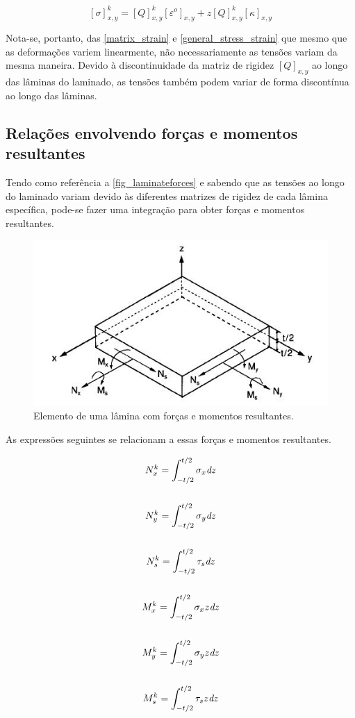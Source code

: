 \begin{equation} \label{general_stress_strain}
		[\sigma]^k_{x,y}=[Q]^k_{x,y}[\varepsilon^o]_{x,y}+z[Q]^k_{x,y}[\kappa]_{x,y}
\end{equation}

Nota-se, portanto, das \autoref{matrix_strain} e \autoref{general_stress_strain} que mesmo que as deformações variem linearmente, não necessariamente as tensões variam da mesma maneira. Devido à discontinuidade da matriz de rigidez $[Q]_{x,y}$ ao longo das lâminas do laminado, as tensões também podem variar de forma discontínua ao longo das lâminas.

\subsection{Relações envolvendo forças e momentos resultantes}
Tendo como referência a \autoref{fig_laminateforces} e sabendo que as tensões ao longo do laminado variam devido às diferentes matrizes de rigidez de cada lâmina específica, pode-se fazer uma integração para obter forças e momentos resultantes.

\begin{figure}[h]
	\caption{\label{fig_laminateforces}Elemento de uma lâmina com forças e momentos resultantes.}
  \centering
  \includegraphics[scale=1.0]{figura/LaminateForcesMoments}
\end{figure}

As expressões seguintes se relacionam a essas forças e momentos resultantes.

\begin{equation} \label{ForcesMoments}
\begin{gathered}
N^k_{x}=\int^{t/2}_{-t/2}\sigma_x\emph{dz}\\~\\
N^k_{y}=\int^{t/2}_{-t/2}\sigma_y\emph{dz}\\~\\
N^k_{s}=\int^{t/2}_{-t/2}\tau_s\emph{dz}\\~\\
M^k_{x}=\int^{t/2}_{-t/2}\sigma_x z\emph{dz}\\~\\
M^k_{y}=\int^{t/2}_{-t/2}\sigma_y z\emph{dz}\\~\\
M^k_{s}=\int^{t/2}_{-t/2}\tau_s z\emph{dz}
\end{gathered}
\end{equation}

